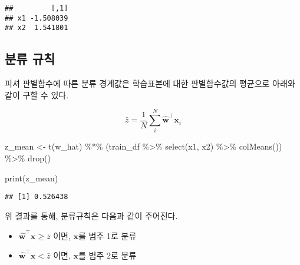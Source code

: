 \documentclass[
]{book}
\newenvironment{Shaded}{\begin{snugshade}}{\end{snugshade}}
\newcommand{\FunctionTok}[1]{\textcolor[rgb]{0.00,0.00,0.00}{#1}}
\newcommand{\NormalTok}[1]{#1}
\newcommand{\OtherTok}[1]{\textcolor[rgb]{0.56,0.35,0.01}{#1}}
\newcommand{\SpecialCharTok}[1]{\textcolor[rgb]{0.00,0.00,0.00}{#1}}
\providecommand{\tightlist}{%
  \setlength{\itemsep}{0pt}\setlength{\parskip}{0pt}}
\begin{document}
\begin{verbatim}
##         [,1]
## x1 -1.508039
## x2  1.541801
\end{verbatim}

\hypertarget{uxbd84uxb958-uxaddcuxce59}{%
\subsection{분류 규칙}\label{uxbd84uxb958-uxaddcuxce59}}

피셔 판별함수에 따른 분류 경계값은 학습표본에 대한 판별함수값의 평균으로 아래와 같이 구할 수 있다.

\begin{equation*}
\bar{z} = \frac{1}{N} \sum_i^N \hat{\mathbf{w}}^\top \mathbf{x}_i
\end{equation*}

\begin{Shaded}
\begin{Highlighting}[]
\NormalTok{z\_mean }\OtherTok{\textless{}{-}} \FunctionTok{t}\NormalTok{(w\_hat) }\SpecialCharTok{\%*\%}\NormalTok{ (train\_df }\SpecialCharTok{\%\textgreater{}\%} \FunctionTok{select}\NormalTok{(x1, x2) }\SpecialCharTok{\%\textgreater{}\%} \FunctionTok{colMeans}\NormalTok{()) }\SpecialCharTok{\%\textgreater{}\%} \FunctionTok{drop}\NormalTok{()}

\FunctionTok{print}\NormalTok{(z\_mean)}
\end{Highlighting}
\end{Shaded}

\begin{verbatim}
## [1] 0.526438
\end{verbatim}

위 결과를 통해, 분류규칙은 다음과 같이 주어진다.

\begin{itemize}
\tightlist
\item
  \(\hat{\mathbf{w}}^\top \mathbf{x} \ge \bar{z}\) 이면, \(\mathbf{x}\)를 범주 1로 분류
\item
  \(\hat{\mathbf{w}}^\top \mathbf{x} < \bar{z}\) 이면, \(\mathbf{x}\)를 범주 2로 분류
\end{itemize}
\end{document}
